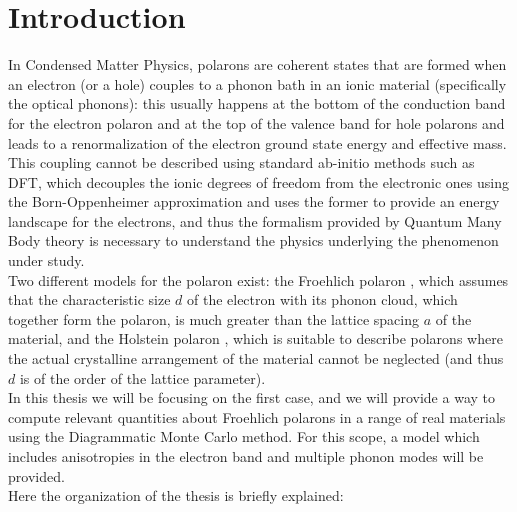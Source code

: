 \section*{Introduction}
In Condensed Matter Physics, polarons are coherent states that are formed when an electron (or a hole) couples to a phonon bath in an ionic material (specifically the optical phonons): 
this usually happens at the bottom of the conduction band for the electron polaron and at the top of the valence band for hole polarons and leads to a renormalization of the electron 
ground state energy and effective mass.\\
This coupling cannot be described using standard ab-initio methods such as DFT, which decouples the ionic degrees of freedom from the electronic ones using 
the Born-Oppenheimer approximation and uses the former to provide an energy landscape for the electrons, and thus the formalism provided by Quantum Many Body theory 
is necessary to understand the physics underlying the phenomenon under study.\\
Two different models for the polaron exist: the Froehlich polaron \cite{frohlich1954electrons}, which assumes that the characteristic size $d$ of the electron with its phonon cloud, 
which together form the polaron, is much greater than the lattice spacing $a$ of the material, and the Holstein polaron \cite{holstein1959studies}\cite{holstein1959studies01}, which is suitable to describe 
polarons where the actual crystalline arrangement of the material cannot be neglected (and thus $d$ is of the order of the lattice parameter).\\
In this thesis we will be focusing on the first case, and we will provide a way to compute relevant quantities about Froehlich polarons in a range 
of real materials using the Diagrammatic Monte Carlo method. For this scope, a model which includes anisotropies in the electron band and multiple phonon modes 
will be provided.\\
Here the organization of the thesis is briefly explained:
